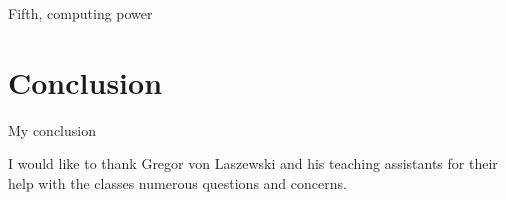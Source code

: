 \documentclass[sigconf]{acmart}
\begin{document}
Fifth, computing power

\section{Conclusion}
My conclusion

\begin{acks}

I would like to thank Gregor von Laszewski and his teaching assistants for their help with the classes numerous questions and concerns.
  
\end{acks}


 

\appendix
 

\end{document}
